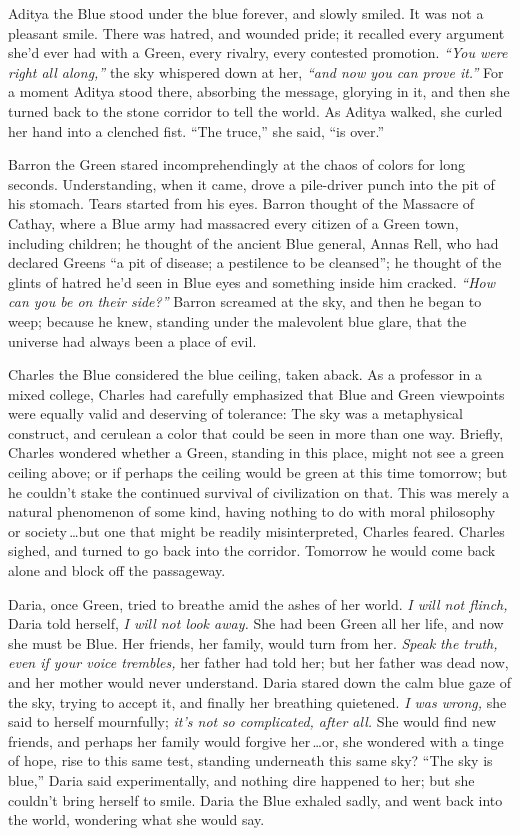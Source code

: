 {
 Aditya the Blue stood under the blue forever, and slowly smiled.
It was not a pleasant smile. There was hatred, and wounded pride; it
recalled every argument she'd ever had with a Green,
every rivalry, every contested promotion.
\textit{``You were right all
along,''} the sky whispered down at her,
\textit{``and now you can prove
it.''} For a moment Aditya stood there, absorbing the
message, glorying in it, and then she turned back to the stone corridor
to tell the world. As Aditya walked, she curled her hand into a
clenched fist. ``The truce,'' she
said, ``is over.''}

{
 Barron the Green stared incomprehendingly at the chaos of colors
for long seconds. Understanding, when it came, drove a pile-driver
punch into the pit of his stomach. Tears started from his eyes. Barron
thought of the Massacre of Cathay, where a Blue army had massacred
every citizen of a Green town, including children; he thought of the
ancient Blue general, Annas Rell, who had declared Greens
``a pit of disease; a pestilence to be
cleansed''; he thought of the glints of hatred
he'd seen in Blue eyes and something inside him
cracked. \textit{``How can you be on their
side?''} Barron screamed at the sky, and then he
began to weep; because he knew, standing under the malevolent blue
glare, that the universe had always been a place of evil.}

{
 Charles the Blue considered the blue ceiling, taken aback. As a
professor in a mixed college, Charles had carefully emphasized that
Blue and Green viewpoints were equally valid and deserving of
tolerance: The sky was a metaphysical construct, and cerulean a color
that could be seen in more than one way. Briefly, Charles wondered
whether a Green, standing in this place, might not see a green ceiling
above; or if perhaps the ceiling would be green at this time tomorrow;
but he couldn't stake the continued survival of
civilization on that. This was merely a natural phenomenon of some
kind, having nothing to do with moral philosophy or society\,\ldots but
one that might be readily misinterpreted, Charles feared. Charles
sighed, and turned to go back into the corridor. Tomorrow he would come
back alone and block off the passageway.}

{
 Daria, once Green, tried to breathe amid the ashes of her world.
\textit{I will not flinch,} Daria told herself, \textit{I will not look
away.} She had been Green all her life, and now she must be Blue. Her
friends, her family, would turn from her. \textit{Speak the truth, even
if your voice trembles,} her father had told her; but her father was
dead now, and her mother would never understand. Daria stared down the
calm blue gaze of the sky, trying to accept it, and finally her
breathing quietened. \textit{I was wrong,} she said to herself
mournfully; \textit{it's not }\textit{so complicated,
after all.} She would find new friends, and perhaps her family would
forgive her\,\ldots or, she wondered with a tinge of hope, rise to this
same test, standing underneath this same sky? ``The
sky is blue,'' Daria said experimentally, and nothing
dire happened to her; but she couldn't bring herself to
smile. Daria the Blue exhaled sadly, and went back into the world,
wondering what she would say.}

